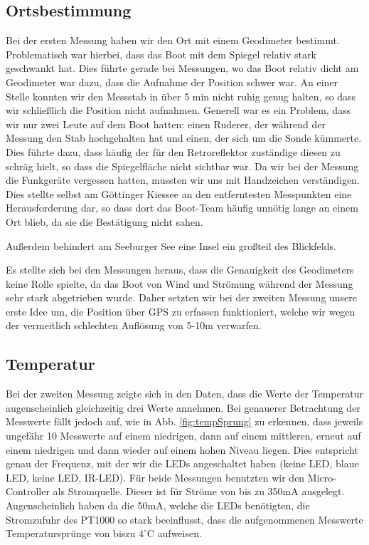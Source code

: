 \documentclass[12pt,a4paper,titlepage,headinclude,bibtotoc]{scrartcl}
\begin{document}
\subsection{Ortsbestimmung}
Bei der ersten Messung haben wir den Ort mit einem Geodimeter bestimmt.
Problematisch war hierbei, dass das Boot mit dem Spiegel relativ stark geschwankt hat.
Dies führte gerade bei Messungen, wo das Boot relativ dicht am Geodimeter war dazu, dass die Aufnahme der Position schwer war.
An einer Stelle konnten wir den Messstab in über 5 min nicht ruhig genug halten, so dass wir schließlich die Position nicht aufnahmen.
Generell war es ein Problem, dass wir nur zwei Leute auf dem Boot hatten: einen Ruderer, der während der Messung den Stab hochgehalten hat und einen, der sich um die Sonde kümmerte.
Dies führte dazu, dass häufig der für den Retroreflektor zuständige diesen zu schräg hielt, so dass die Spiegelfläche nicht sichtbar war.
Da wir bei der Messung die Funkgeräte vergessen hatten, mussten wir uns mit Handzeichen verständigen.
Dies stellte selbst am Göttinger Kiessee an den entferntesten Messpunkten eine Herausforderung dar, so dass dort das Boot-Team häufig unnötig lange an einem Ort blieb, da sie die Bestätigung nicht sahen.


Außerdem behindert am Seeburger See eine Insel ein großteil des Blickfelds.

Es stellte sich bei den Messungen heraus, dass die Genauigkeit des Geodimeters keine Rolle spielte, da das Boot von Wind und Strömung während der Messung sehr stark abgetrieben wurde.
Daher setzten wir bei der zweiten Messung unsere erste Idee um, die Position über GPS zu erfassen funktioniert, welche wir wegen der vermeitlich schlechten Auflösung von 5-10m verwarfen.

\subsection{Temperatur}
Bei der zweiten Messung zeigte sich in den Daten, dass die Werte der Temperatur augenscheinlich gleichzeitig drei Werte annehmen.
Bei genauerer Betrachtung der Messwerte fällt jedoch auf, wie in Abb. \ref{fig:tempSprung} zu erkennen, dass jeweils ungefähr 10 Messwerte auf einem niedrigen, dann auf einem mittleren, erneut auf einem niedrigen und dann wieder auf einem hohen Niveau liegen.
Dies  entspricht genau der Frequenz, mit der wir die LEDs angeschaltet haben (keine LED, blaue LED, keine LED, IR-LED).
Für beide Messungen benutzten wir den Micro-Controller als Stromquelle.
Dieser ist für Ströme von bis zu 350mA ausgelegt.
Augenscheinlich haben da die 50mA, welche die LEDs benötigten, die Stromzufuhr des PT1000 so stark beeinflusst, dass die aufgenommenen Messwerte Temperatursprünge von biszu $4^\circ $C aufweisen.
\end{document}
